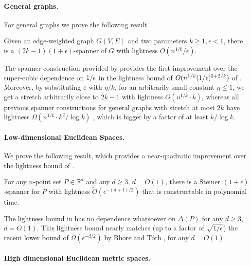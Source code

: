 \paragraph{General graphs.~} 
For general graphs we prove the following result.

\begin{theorem}\label{thm:light-general-spanner}
Given an edge-weighted graph $G(V,E)$ and two parameters $k \geq 1, \epsilon < 1$, there is a $(2k-1)(1+\epsilon)$-spanner of $G$ with lightness $O(n^{1/k}/{\epsilon})$.
\end{theorem}

The spanner construction provided by 
provides the first improvement over the super-cubic dependence on $1/\epsilon$ in the lightness bound of $O(n^{1/k}(1/\epsilon)^{3+2/k})$ of  \cite{CW16}.  Moreover, by substituting $\epsilon$ with $\eta / k$, for an arbitrarily small constant $\eta \le 1$, we get a stretch arbitrarily close to $2k-1$ with lightness $O({n^{1/k} \cdot k})$,
whereas all previous spanner constructions for general graphs with stretch at most $2k$ have lightness $\Omega(n^{1/k} \cdot k^2 / \log k)$ \cite{CDNS92,ENS14,CW16}, which is bigger by a factor of at least $k / \log k$.

\paragraph{Low-dimensional Euclidean Spaces.~} 
We prove the following result, which provides a near-quadratic improvement over the lightness bound of \cite{LS19}. 

 \begin{theorem}\label{thm:light-Steiner}
 For any $n$-point set $P \in \mathbb{R}^d$ and any $d \ge 3$, $d = O(1)$, there is a Steiner $(1+\epsilon)$-spanner for $P$ with lightness 
 $\tilde{O}(\epsilon^{-(d+1)/2})$ that is constructable in polynomial time.
 \end{theorem}

The lightness bound in  has no dependence whatsoever on $\Delta(P)$ for any $d\geq 3$, $d = O(1)$. This lightness bound nearly matches (up to a factor of $\sqrt{1/\epsilon}$) the recent lower bound of $\Omega(\epsilon^{-d/2})$ by
Bhore and T{\'{o}}th \cite{BT21B}, for any $d = O(1)$.

\paragraph{High dimensional Euclidean metric spaces.~}

